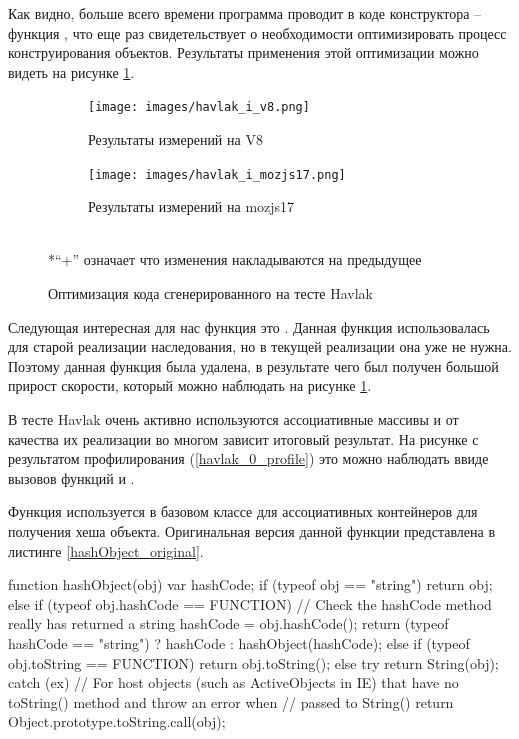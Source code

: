 Как видно, больше всего времени программа проводит в коде конструктора -- функция , что еще раз свидетельствует о необходимости оптимизировать процесс конструирования объектов. Результаты применения этой оптимизации можно видеть на рисунке \ref{havlak_i}.

\begin{figure}[ht!]
\centering
  \begin{subfigure}[b]{0.7\textwidth}
  \centering
  \texttt{[image: images/havlak\_i\_v8.png]}
  \caption{Результаты измерений на V8}
    \end{subfigure}

    \begin{subfigure}[b]{0.7\textwidth}
  \centering
  \texttt{[image: images/havlak\_i\_mozjs17.png]}
  \caption{Результаты измерений на mozjs17}
    \end{subfigure}
\\*``+'' означает что изменения накладываются на предыдущее
\caption{Оптимизация кода сгенерированного на тесте Havlak}
\label{havlak_i}
\end{figure}

Следующая интересная для нас функция это . Данная функция использовалась для старой реализации наследования, но в текущей реализации она уже не нужна. Поэтому данная функция была удалена, в результате чего был получен большой прирост скорости, который можно наблюдать на рисунке \ref{havlak_i}.

В тесте Havlak очень активно используются ассоциативные массивы и от качества их реализации во многом зависит итоговый результат.
На рисунке с результатом профилирования (\ref{havlak_0_profile}) это можно наблюдать ввиде вызовов функций  и .

Функция  используется в базовом классе для ассоциативных контейнеров  для получения хеша объекта. Оригинальная версия данной функции представлена в листинге \ref{hashObject_original}.

\begin{code}
\begin{JavaScript}[caption=Оригинальная версия функции hashObject, label=hashObject_original]
function hashObject(obj) {
    var hashCode;
    if (typeof obj == "string") {
        return obj;
    }
    else if (typeof obj.hashCode == FUNCTION) {
        // Check the hashCode method really has returned a string
        hashCode = obj.hashCode();
        return (typeof hashCode == "string") ? hashCode : hashObject(hashCode);
    }
    else if (typeof obj.toString == FUNCTION) {
        return obj.toString();
    }
    else {
        try {
            return String(obj);
        }
        catch (ex) {
            // For host objects (such as ActiveObjects in IE) that have no toString() method and throw an error when
            // passed to String()
            return Object.prototype.toString.call(obj);
        }
    }
}
\end{JavaScript}
\end{code}

